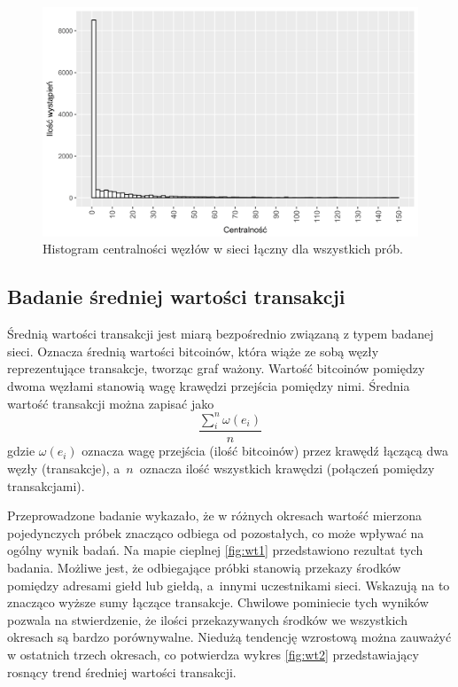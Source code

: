 \documentclass[12pt, twoside, final, openany]{mgr}
\newcommand{\chartsWidth}{0.8}
\begin{document}
\begin{figure}[H]
\centering
   \includegraphics[width=\chartsWidth\linewidth]{pictures/srednia_centralnosc/srednia_centralnosc_hist.png}
   \caption{Histogram centralności węzłów w sieci łączny dla wszystkich prób.}
   \label{fig:sc3}
\end{figure}

\subsection{Badanie średniej wartości transakcji}
\label{wartosc_transakcji}
\indent Średnią wartości transakcji jest miarą bezpośrednio związaną z typem badanej sieci. Oznacza średnią wartości bitcoinów, która wiąże ze sobą węzły reprezentujące transakcje, tworząc graf ważony. Wartość bitcoinów pomiędzy dwoma węzłami stanowią wagę krawędzi przejścia pomiędzy nimi. Średnia wartość transakcji można zapisać jako
\begin{equation}
\label{eq:wartosc_transakcji}
\frac{\sum_{i}^{n} \omega(e_i)}{n}
\end{equation}
gdzie $\omega(e_i)$ oznacza wagę przejścia (ilość bitcoinów) przez krawędź łączącą dwa węzły (transakcje), a~$n$~oznacza ilość wszystkich krawędzi (połączeń pomiędzy transakcjami). 

\indent Przeprowadzone badanie wykazało, że w różnych okresach wartość mierzona pojedynczych próbek znacząco odbiega od pozostałych, co może wpływać na ogólny wynik badań.
Na mapie cieplnej \ref{fig:wt1} przedstawiono rezultat tych badania. Możliwe jest, że odbiegające próbki stanowią przekazy środków pomiędzy adresami giełd lub giełdą, a~innymi uczestnikami sieci. Wskazują na to znacząco wyższe sumy łączące transakcje. Chwilowe pominiecie tych wyników pozwala na stwierdzenie, że ilości przekazywanych środków we wszystkich okresach są bardzo porównywalne. Niedużą tendencję wzrostową można zauważyć w ostatnich trzech okresach, co potwierdza wykres \ref{fig:wt2} przedstawiający rosnący trend średniej wartości transakcji. 
\end{document}
